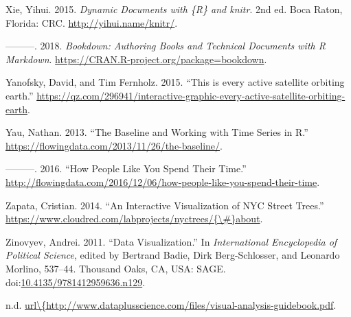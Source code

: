\documentclass[]{book}
\theoremstyle{definition}
\theoremstyle{definition}
\theoremstyle{definition}
\theoremstyle{remark}
\begin{document}
\hypertarget{ref-xie2015}{}
Xie, Yihui. 2015. \emph{Dynamic Documents with \{R\} and knitr}. 2nd ed.
Boca Raton, Florida: CRC. \url{http://yihui.name/knitr/}.

\hypertarget{ref-R-bookdown}{}
---------. 2018. \emph{Bookdown: Authoring Books and Technical Documents
with R Markdown}. \url{https://CRAN.R-project.org/package=bookdown}.

\hypertarget{ref-Satellite}{}
Yanofsky, David, and Tim Fernholz. 2015. ``This is every active
satellite orbiting earth.''
\url{https://qz.com/296941/interactive-graphic-every-active-satellite-orbiting-earth}.

\hypertarget{ref-baseline_2013}{}
Yau, Nathan. 2013. ``The Baseline and Working with Time Series in R.''
\url{https://flowingdata.com/2013/11/26/the-baseline/}.

\hypertarget{ref-spendingtime}{}
---------. 2016. ``How People Like You Spend Their Time.''
\url{http://flowingdata.com/2016/12/06/how-people-like-you-spend-their-time}.

\hypertarget{ref-trees}{}
Zapata, Cristian. 2014. ``An Interactive Visualization of NYC Street
Trees.''
\href{https://www.cloudred.com/labprojects/nyctrees/\%7B/\#\%7Dabout}{https://www.cloudred.com/labprojects/nyctrees/\{\textbackslash{}\#\}about}.

\hypertarget{ref-poli_social_science}{}
Zinovyev, Andrei. 2011. ``Data Visualization.'' In \emph{International
Encyclopedia of Political Science}, edited by Bertrand Badie, Dirk
Berg-Schlosser, and Leonardo Morlino, 537--44. Thousand Oaks, CA, USA:
SAGE.
doi:\href{https://doi.org/10.4135/9781412959636.n129}{10.4135/9781412959636.n129}.

\hypertarget{ref-dataviz_bestprac}{}
n.d.
\href{url/\%7Bhttp://www.dataplusscience.com/files/visual-analysis-guidebook.pdf}{url\textbackslash{}\{http://www.dataplusscience.com/files/visual-analysis-guidebook.pdf}.
\end{document}
